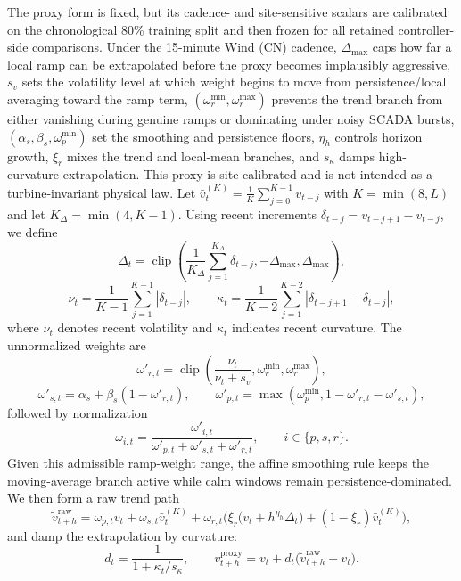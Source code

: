 \documentclass[review,1p,times]{elsarticle}
\begin{document}
The proxy form is fixed, but its cadence- and site-sensitive scalars are calibrated on the chronological 80\% training split and then frozen for all retained controller-side comparisons. Under the 15-minute Wind (CN) cadence, $\Delta_{\max}$ caps how far a local ramp can be extrapolated before the proxy becomes implausibly aggressive, $s_v$ sets the volatility level at which weight begins to move from persistence/local averaging toward the ramp term, $(\omega_r^{\min},\omega_r^{\max})$ prevents the trend branch from either vanishing during genuine ramps or dominating under noisy SCADA bursts, $(\alpha_s,\beta_s,\omega_p^{\min})$ set the smoothing and persistence floors, $\eta_h$ controls horizon growth, $\xi_r$ mixes the trend and local-mean branches, and $s_\kappa$ damps high-curvature extrapolation. This proxy is site-calibrated and is not intended as a turbine-invariant physical law. Let $\bar{v}^{(K)}_t=\frac{1}{K}\sum_{j=0}^{K-1}v_{t-j}$ with $K=\min(8,L)$ and let $K_\Delta=\min(4,K-1)$. Using recent increments $\delta_{t-j}=v_{t-j+1}-v_{t-j}$, we define
\begin{equation}
\Delta_t=\operatorname{clip}\!\left(\frac{1}{K_\Delta}\sum_{j=1}^{K_\Delta}\delta_{t-j},-\Delta_{\max},\Delta_{\max}\right),
\end{equation}
\begin{equation}
\nu_t=\frac{1}{K-1}\sum_{j=1}^{K-1}|\delta_{t-j}|,\qquad
\kappa_t=\frac{1}{K-2}\sum_{j=1}^{K-2}|\delta_{t-j+1}-\delta_{t-j}|,
\end{equation}
where $\nu_t$ denotes recent volatility and $\kappa_t$ indicates recent curvature. The unnormalized weights are
\begin{equation}
\omega'_{r,t}=\operatorname{clip}\!\left(\frac{\nu_t}{\nu_t+s_v},\omega_r^{\min},\omega_r^{\max}\right),
\end{equation}
\begin{equation}
\omega'_{s,t}=\alpha_s+\beta_s(1-\omega'_{r,t}),\qquad
\omega'_{p,t}=\max\!\left(\omega_p^{\min},1-\omega'_{r,t}-\omega'_{s,t}\right),
\end{equation}
followed by normalization
\begin{equation}
\omega_{i,t}=\frac{\omega'_{i,t}}{\omega'_{p,t}+\omega'_{s,t}+\omega'_{r,t}},\qquad i\in\{p,s,r\}.
\end{equation}
Given this admissible ramp-weight range, the affine smoothing rule keeps the moving-average branch active while calm windows remain persistence-dominated.
We then form a raw trend path
\begin{equation}
\tilde{v}_{t+h}^{\mathrm{raw}}=\omega_{p,t}v_t+\omega_{s,t}\bar{v}^{(K)}_t+\omega_{r,t}\Big(\xi_r\big(v_t+h^{\eta_h}\Delta_t\big)+(1-\xi_r)\bar{v}^{(K)}_t\Big),
\end{equation}
and damp the extrapolation by curvature:
\begin{equation}
d_t=\frac{1}{1+\kappa_t/s_\kappa},\qquad
v_{t+h}^{\mathrm{proxy}}=v_t+d_t\big(\tilde{v}_{t+h}^{\mathrm{raw}}-v_t\big).
\end{equation}
\end{document}
